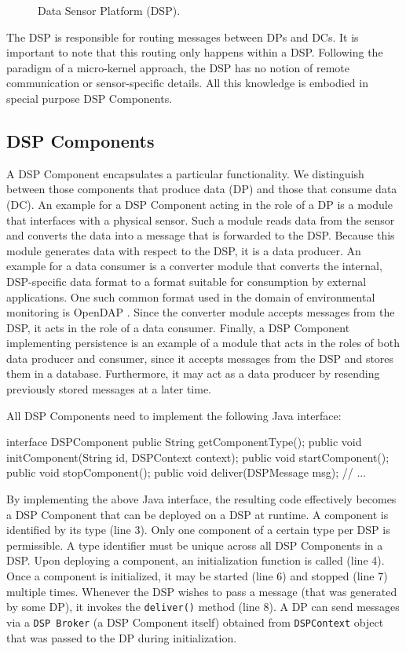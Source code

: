 \documentclass[conference]{IEEEtran}
\begin{document}
\begin{figure}
\centering
{}
\caption{\label{FIG_DSP} Data Sensor Platform (DSP).}
\end{figure}

The DSP is responsible for routing messages between DPs and DCs. It is
important to note that this routing only happens within a
DSP. Following the paradigm of a micro-kernel approach, the DSP has no
notion of remote communication or sensor-specific details. All this
knowledge is embodied in special purpose DSP Components.

\subsection{DSP Components}

A DSP Component encapsulates a particular functionality. We
distinguish between those components that produce data (DP) and those
that consume data (DC). An example for a DSP Component acting in the
role of a DP is a module that interfaces with a physical sensor. Such
a module reads data from the sensor and converts the data into a
message that is forwarded to the DSP. Because this module generates
data with respect to the DSP, it is a data producer. An example for a
data consumer is a converter module that converts the internal,
DSP-specific data format to a format suitable for consumption by
external applications. One such common format used in the domain of
environmental monitoring is OpenDAP \cite{opendap01}.  Since the
converter module accepts messages from the DSP, it acts in the role of
a data consumer. Finally, a DSP Component implementing persistence is
an example of a module that acts in the roles of both data producer
and consumer, since it accepts messages from the DSP and stores them in a
database. Furthermore, it may act as a data producer by resending previously
stored messages at a later time.

All DSP Components need to implement the following Java interface:

\begin{code}
interface DSPComponent
{
   public String getComponentType();
   public void initComponent(String     id, 
                             DSPContext context);
   public void startComponent();
   public void stopComponent();
   public void deliver(DSPMessage msg);
   // ...
}
\end{code}

By implementing the above Java interface, the resulting code
effectively becomes a DSP Component that can be deployed on a DSP at
runtime. A component is identified by its type (line 3). Only one
component of a certain type per DSP is permissible. A type identifier
must be unique across all DSP Components in a DSP. Upon deploying a
component, an initialization function is called (line 4). Once a
component is initialized, it may be started (line 6) and stopped (line
7) multiple times. Whenever the DSP wishes to pass a message (that was
generated by some DP), it invokes the \texttt{deliver()} method (line
8). A DP can send messages via a \texttt{DSP Broker} (a DSP Component itself) 
obtained from \texttt{DSPContext} object that was
passed to the DP during initialization.
\end{document}

